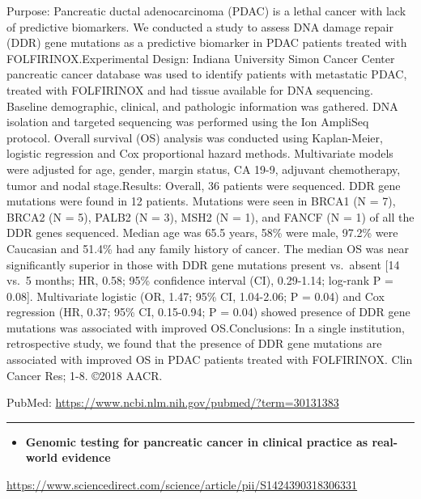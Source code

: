 \documentclass[]{article}
\providecommand{\tightlist}{%
  \setlength{\itemsep}{0pt}\setlength{\parskip}{0pt}}
\begin{document}
Purpose: Pancreatic ductal adenocarcinoma (PDAC) is a lethal cancer with
lack of predictive biomarkers. We conducted a study to assess DNA damage
repair (DDR) gene mutations as a predictive biomarker in PDAC patients
treated with FOLFIRINOX.Experimental Design: Indiana University Simon
Cancer Center pancreatic cancer database was used to identify patients
with metastatic PDAC, treated with FOLFIRINOX and had tissue available
for DNA sequencing. Baseline demographic, clinical, and pathologic
information was gathered. DNA isolation and targeted sequencing was
performed using the Ion AmpliSeq protocol. Overall survival (OS)
analysis was conducted using Kaplan-Meier, logistic regression and Cox
proportional hazard methods. Multivariate models were adjusted for age,
gender, margin status, CA 19-9, adjuvant chemotherapy, tumor and nodal
stage.Results: Overall, 36 patients were sequenced. DDR gene mutations
were found in 12 patients. Mutations were seen in BRCA1 (N = 7), BRCA2
(N = 5), PALB2 (N = 3), MSH2 (N = 1), and FANCF (N = 1) of all the DDR
genes sequenced. Median age was 65.5 years, 58\% were male, 97.2\% were
Caucasian and 51.4\% had any family history of cancer. The median OS was
near significantly superior in those with DDR gene mutations present
vs.~absent {[}14 vs.~5 months; HR, 0.58; 95\% confidence interval (CI),
0.29-1.14; log-rank P = 0.08{]}. Multivariate logistic (OR, 1.47; 95\%
CI, 1.04-2.06; P = 0.04) and Cox regression (HR, 0.37; 95\% CI,
0.15-0.94; P = 0.04) showed presence of DDR gene mutations was
associated with improved OS.Conclusions: In a single institution,
retrospective study, we found that the presence of DDR gene mutations
are associated with improved OS in PDAC patients treated with
FOLFIRINOX. Clin Cancer Res; 1-8. ©2018 AACR.

PubMed: \url{https://www.ncbi.nlm.nih.gov/pubmed/?term=30131383}

{}

{}

\begin{center}\rule{0.5\linewidth}{\linethickness}\end{center}

\begin{itemize}
\tightlist
\item
  \textbf{Genomic testing for pancreatic cancer in clinical practice as
  real-world evidence}
\end{itemize}

\url{https://www.sciencedirect.com/science/article/pii/S1424390318306331}
\end{document}
